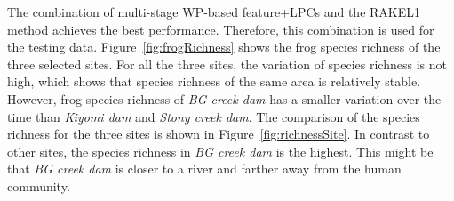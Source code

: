 The combination of multi-stage WP-based feature+LPCs and the RAKEL1 method achieves the best performance. Therefore, this combination is used for the testing data. 
Figure~\ref{fig:frogRichness} shows the frog species richness of the three selected sites. For all the three sites, the variation of species richness is not high, which shows that species richness of the same area is relatively stable. However, frog species richness of \textit{BG creek dam} has a smaller variation over the time than \textit{Kiyomi dam} and \textit{Stony creek dam}. The comparison of the species richness for the three sites is shown in Figure~\ref{fig:richnessSite}. In contrast to other sites, the species richness in \textit{BG creek dam} is the highest. This might be that \textit{BG creek dam} is closer to a river and farther away from the human community.


